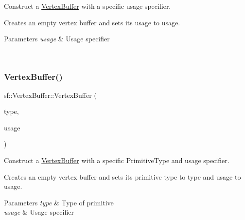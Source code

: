 Construct a \mbox{\hyperlink{classsf_1_1_vertex_buffer}{Vertex\+Buffer}} with a specific usage specifier. 

Creates an empty vertex buffer and sets its usage to {\ttfamily usage}.


\begin{DoxyParams}{Parameters}
{\em usage} & Usage specifier \begin{DoxyVerb}\end{DoxyVerb}
 \\
\hline
\end{DoxyParams}
\mbox{\label{classsf_1_1_vertex_buffer_a326a5c89f1ba01b51b323535494434e8}} 
\subsubsection{\texorpdfstring{VertexBuffer()}{VertexBuffer()}\hspace{0.1cm}{\footnotesize\ttfamily [4/5]}}
{\footnotesize\ttfamily sf\+::\+Vertex\+Buffer\+::\+Vertex\+Buffer (\begin{DoxyParamCaption}\item[{\mbox{\hyperlink{group__graphics_ga5ee56ac1339984909610713096283b1b}{Primitive\+Type}}}]{type,  }\item[{\mbox{\hyperlink{classsf_1_1_vertex_buffer_a3a531528684e63ecb45edd51282f5cb7}{Usage}}}]{usage }\end{DoxyParamCaption})}



Construct a \mbox{\hyperlink{classsf_1_1_vertex_buffer}{Vertex\+Buffer}} with a specific Primitive\+Type and usage specifier. 

Creates an empty vertex buffer and sets its primitive type to {\ttfamily type} and usage to {\ttfamily usage}.


\begin{DoxyParams}{Parameters}
{\em type} & Type of primitive \\
\hline
{\em usage} & Usage specifier \begin{DoxyVerb}\end{DoxyVerb}
 \\
\hline
\end{DoxyParams}
\mbox{\label{classsf_1_1_vertex_buffer_a2f2ff1e218cfc749b87f8873e23c016b}} 
